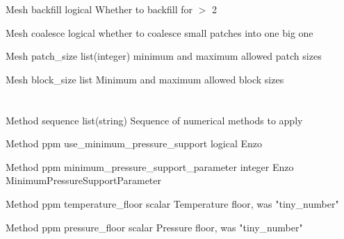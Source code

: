 \documentclass{book}
\begin{document}
\Parameter
{Mesh}
{}
{backfill}
{logical}
{}
{Whether to backfill for  $>$ 2}
{}
{}

\Parameter
{Mesh}
{}
{coalesce}
{logical}
{}
{whether to coalesce small patches into one big one}
{}
{}

\Parameter
{Mesh}
{}
{patch\_size}
{list(integer)}
{}
{minimum and maximum allowed patch sizes}
{}
{}

\Parameter
{Mesh}
{}
{block\_size}
{list}
{}
{Minimum and maximum allowed block sizes}
{}
{}

\section{}

\Parameter
{Method}
{}
{sequence}
{list(string)}
{}
{Sequence of numerical methods to apply}
{}
{}

\Parameter
{Method}
{ppm}
{use\_minimum\_pressure\_support}
{logical}
{}
{Enzo }
{}
{}
 	 	 	 	
\Parameter
{Method}
{ppm}
{minimum\_pressure\_support\_parameter}
{integer}
{}
{Enzo MinimumPressureSupportParameter}
{}
{}

 	 	 	 	
\Parameter
{Method}
{ppm}
{temperature\_floor}
{scalar}
{}
{Temperature floor, was "tiny\_number"}
{}
{}

 	 	 	 	
\Parameter
{Method}
{ppm}
{pressure\_floor}
{scalar}
{}
{Pressure floor, was "tiny\_number"}
{}
{}
\end{document}
